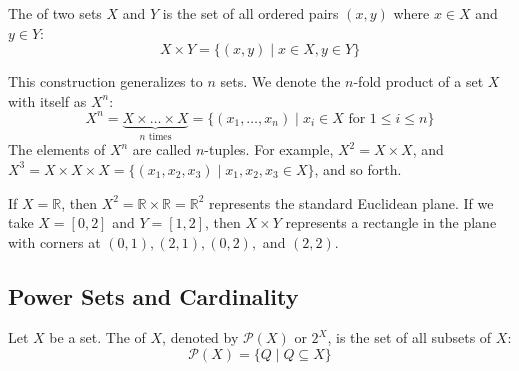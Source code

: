 \begin{definition}
The  of two sets $X$ and $Y$ is the set of all ordered pairs $(x, y)$ where $x \in X$ and $y \in Y$:
\[
X \times Y = \{(x, y) \mid x \in X, y \in Y\}
\]
\end{definition}

This construction generalizes to $n$ sets. We denote the $n$-fold product of a set $X$ with itself as $X^n$:
\[
X^n = \underbrace{X \times \dots \times X}_{n \text{ times}} = \{(x_1, \dots, x_n) \mid x_i \in X \text{ for } 1 \le i \le n\}
\]
The elements of $X^n$ are called $n$-tuples. For example, $X^2 = X \times X$, and $X^3 = X \times X \times X = \{(x_1, x_2, x_3) \mid x_1, x_2, x_3 \in X\}$, and so forth.

\begin{example}
If $X = \mathbb{R}$, then $X^2 = \mathbb{R} \times \mathbb{R} = \mathbb{R}^2$ represents the standard Euclidean plane. If we take $X = [0, 2]$ and $Y = [1, 2]$, then $X \times Y$ represents a rectangle in the plane with corners at $(0,1), (2,1), (0,2),$ and $(2,2)$.

\begin{center}
\end{center}
\end{example}

\subsection{Power Sets and Cardinality}

\begin{definition}
Let $X$ be a set. The  of $X$, denoted by $\mathcal{P}(X)$ or $2^X$, is the set of all subsets of $X$:
\[
\mathcal{P}(X) = \{Q \mid Q \subseteq X\}
\]
\end{definition}

